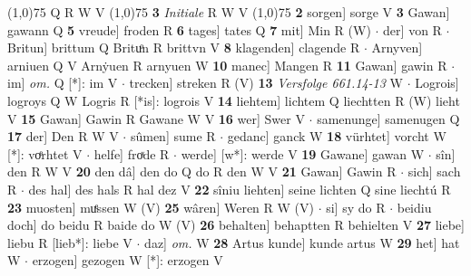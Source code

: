 \documentclass[8pt,a4paper,notitlepage]{article}
\begin{document}
\begin{table}[ht]
\begin{minipage}[t]{0.5\linewidth}
\begin{tabular}{rl}
\end{tabular}
\scriptsize
\line(1,0){75} \newline
Q R W V \newline
\line(1,0){75} \newline
\textbf{3} \textit{Initiale} R W V  \newline
\line(1,0){75} \newline
\textbf{2} sorgen] sorge V \textbf{3} Gawan] gawann Q \textbf{5} vreude] froden R \textbf{6} tages] tates Q \textbf{7} mit] Min R (W)  $\cdot$ der] von R  $\cdot$ Britun] brittum Q Brituͦn R brittvn V \textbf{8} klagenden] clagende R  $\cdot$ Arnyven] arniuen Q V Arnẏuen R arnyuen W \textbf{10} manec] Mangen R \textbf{11} Gawan] gawin R  $\cdot$ im] \textit{om.} Q [*]: im V  $\cdot$ trecken] streken R (V) \textbf{13} \textit{Versfolge 661.14-13} W   $\cdot$ Logrois] logroys Q W Logris R [*is]: logrois V \textbf{14} liehtem] lichtem Q liechtten R (W) lieht V \textbf{15} Gawan] Gawin R Gawane W V \textbf{16} wer] Swer V  $\cdot$ samenunge] samenugen Q \textbf{17} der] Den R W V  $\cdot$ sûmen] sume R  $\cdot$ gedanc] ganck W \textbf{18} vürhtet] vorcht W [*]: voͤrhtet V  $\cdot$ helfe] froͯde R  $\cdot$ werde] [w*]: werde V \textbf{19} Gawane] gawan W  $\cdot$ sîn] den R W V \textbf{20} den dâ] den do Q do R den W V \textbf{21} Gawan] Gawin R  $\cdot$ sich] sach R  $\cdot$ des hal] des hals R hal dez V \textbf{22} sîniu liehten] seine lichten Q sine liechtú R \textbf{23} muosten] muͤssen W (V) \textbf{25} wâren] Weren R W (V)  $\cdot$ si] sy do R  $\cdot$ beidiu doch] do beidu R baide do W (V) \textbf{26} behalten] behaptten R behielten V \textbf{27} liebe] liebu R [lieb*]: liebe V  $\cdot$ daz] \textit{om.} W \textbf{28} Artus kunde] kunde artus W \textbf{29} het] hat W  $\cdot$ erzogen] gezogen W [*]: erzogen V \newline
\end{minipage}
\end{table}
\end{document}
